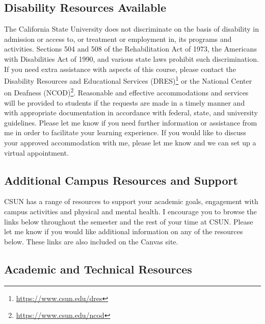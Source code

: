 \documentclass[
  letterpaper,
  DIV=11,
  numbers=noendperiod,
  oneside]{scrartcl}
\DeclareRobustCommand{\href}[2]{#2\footnote{\url{#1}}}
\begin{document}
\hypertarget{disability-resources-available}{%
\subsection{\texorpdfstring{\textbf{Disability Resources
Available}}{Disability Resources Available}}\label{disability-resources-available}}

The California State University does not discriminate on the basis of
disability in admission or access to, or treatment or employment in, its
programs and activities. Sections 504 and 508 of the Rehabilitation Act
of 1973, the Americans with Disabilities Act of 1990, and various state
laws prohibit such discrimination. If you need extra assistance with
aspects of this course, please contact the
\href{https://www.csun.edu/dres}{Disability Resources and Educational
Services (DRES)} or the \href{https://www.csun.edu/ncod}{National Center
on Deafness (NCOD)}. Reasonable and effective accommodations and
services will be provided to students if the requests are made in a
timely manner and with appropriate documentation in accordance with
federal, state, and university guidelines. Please let me know if you
need further information or assistance from me in order to facilitate
your learning experience. If you would like to discuss your approved
accommodation with me, please let me know and we can set up a virtual
appointment.~

\hypertarget{additional-campus-resources-and-support}{%
\subsection{\texorpdfstring{\textbf{Additional Campus Resources and
Support}}{Additional Campus Resources and Support}}\label{additional-campus-resources-and-support}}

CSUN has a range of resources to support your academic goals, engagement
with campus activities and physical and mental health. I encourage you
to browse the links below throughout the semester and the rest of your
time at CSUN. Please let me know if you would like additional
information on any of the resources below. These links are also included
on the Canvas site.

\hypertarget{academic-and-technical-resources}{%
\subsection{Academic and Technical
Resources}\label{academic-and-technical-resources}}
\end{document}

